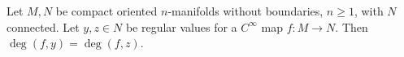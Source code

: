 Let $M, N$ be compact oriented $n$-manifolds without boundaries, $n \geqslant 1$, with $N$ connected. Let $y, z \in N$ be regular values for a $C^\infty$ map $f: M \to N$. Then $\deg(f, y) = \deg(f, z)$.
